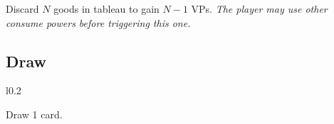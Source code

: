 \documentclass[letterpaper,landscape,twocolumn,8pt]{extarticle}
\begin{document}
\begin{minipage}[t]{0.31\columnwidth}
Discard $N$ goods in tableau to gain \mbox{$N-1$} VPs.
\smallbreak{}
\textit{The player may use other consume powers before triggering this one.}
\subsection*{\RaggedRight{}Draw}
\begin{wrapfigure}{l}{0.2\columnwidth}
    
\end{wrapfigure}

Draw 1 card.

\end{minipage}
\end{document}
